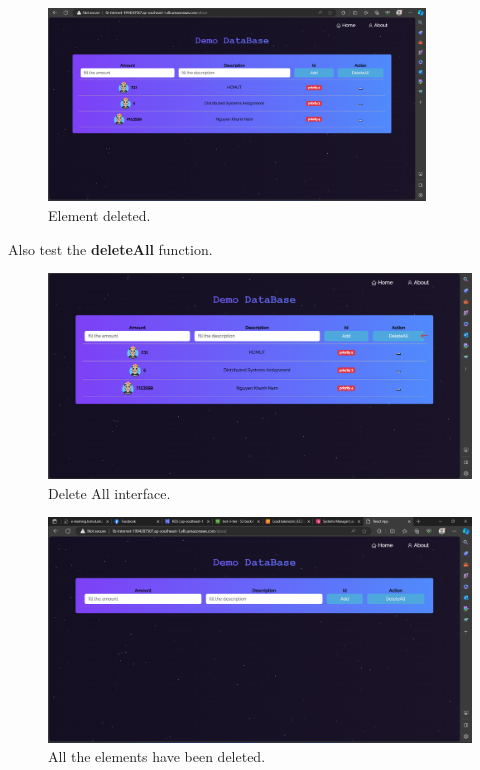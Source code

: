 \documentclass{article}
\begin{document}
\begin{figure}[!htp]
    \centering
    \includegraphics[width=10cm]{Pictures/Internet/Delete_2.png}
    \caption{Element deleted.}
    \label{fig:enter-label}
\end{figure}
\newpage
Also test the \textbf{deleteAll} function.\par
\begin{figure}[h]
    \centering
    \includegraphics[width=12cm]{Pictures/Internet/DeleteAll_1.png}
    \caption{Delete All interface.}
    \label{fig:enter-label}
\end{figure}

\begin{figure}[h]
    \centering
    \includegraphics[width=12cm]{Pictures/Internet/DeleteAll_2.png}
    \caption{All the elements have been deleted.}
    \label{fig:enter-label}
\end{figure}
\newpage
\end{document}

